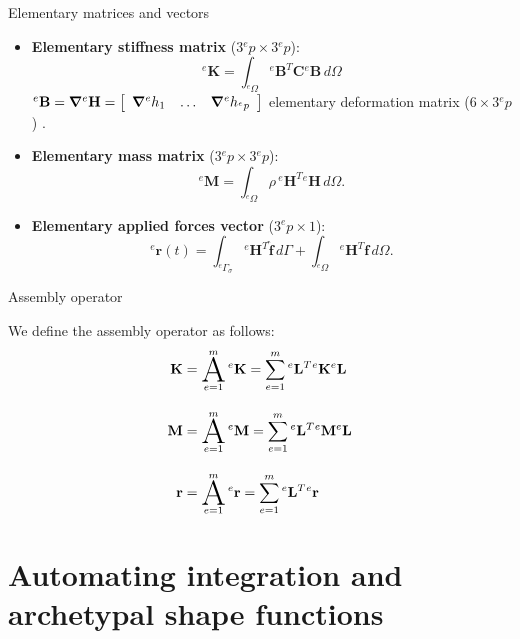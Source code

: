 \documentclass[aspectratio=169]{beamer}
\begin{document}
{
\begin{frame}{Elementary matrices and vectors}
  \begin{block}{}
    \begin{itemize}
      \item \textbf{Elementary stiffness matrix} ($3{}^e p\times 3{}^e p$):
            $${}^e\mathbf K=\int_{{}^e\Omega} {}^e\mathbf B^T\mathbf C{}^e\mathbf B \, d\Omega$$
            ${}^e\mathbf B=\boldsymbol{\nabla} {}^e\mathbf H=\left[
                \begin{array}{c;{2pt/2pt}c;{2pt/2pt}c}
                  \boldsymbol{\nabla} {}^eh_1 & \dots & \boldsymbol{\nabla} {}^eh_{{}^ep}
                \end{array} \right]$
            elementary deformation matrix ($6\times 3{}^e p$) .
      \item \textbf{Elementary mass matrix} ($3{}^e p\times 3{}^e p$):
            $${}^e\mathbf M=\int_{{}^e\Omega} \rho\, {}^e\mathbf H^T{}^e\mathbf H \, d\Omega.$$
      \item \textbf{Elementary applied forces vector} ($3{}^e p\times 1$):
            $${}^e\mathbf r(t)=\int_{{}^e\Gamma_\sigma} {}^e\mathbf H^{T}\mathbf{\hat f} \, d\Gamma+\int_{{}^e\Omega} {}^e\mathbf H^{T}\mathbf f\, d\Omega.$$
    \end{itemize}
  \end{block}
\end{frame}

\begin{frame}{Assembly operator}
  \begin{block}{}
    We define the assembly operator as follows:
    \begin{align*}
      \mathbf K & =\A_{e=1}^m {}^e\mathbf K = \sum_{e=1}^{m} {}^e\mathbf L^T {}^e\mathbf K{}^e\mathbf L \\[10pt]
      \mathbf M & =\A_{e=1}^m {}^e\mathbf M = \sum_{e=1}^{m} {}^e\mathbf L^T {}^e\mathbf M{}^e\mathbf L \\[10pt]
      \mathbf r & =\A_{e=1}^m {}^e\mathbf r = \sum_{e=1}^{m} {}^e\mathbf L^T {}^e\mathbf r{}            \\
    \end{align*}
  \end{block}
\end{frame}
}

\section{Automating integration and archetypal shape functions}
\end{document}
